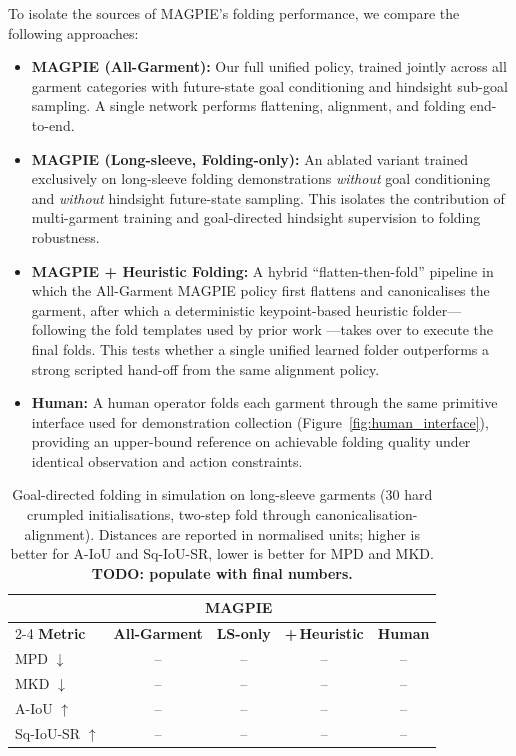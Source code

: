\documentclass[journal]{IEEEtran}
\begin{document}
To isolate the sources of MAGPIE's folding performance, we compare the following approaches:
\begin{itemize}
    \item \textbf{MAGPIE (All-Garment):} Our full unified policy, trained jointly across all garment categories with future-state goal conditioning and hindsight sub-goal sampling. A single network performs flattening, alignment, and folding end-to-end.
    \item \textbf{MAGPIE (Long-sleeve, Folding-only):} An ablated variant trained exclusively on long-sleeve folding demonstrations \emph{without} goal conditioning and \emph{without} hindsight future-state sampling. This isolates the contribution of multi-garment training and goal-directed hindsight supervision to folding robustness.
    \item \textbf{MAGPIE + Heuristic Folding:} A hybrid ``flatten-then-fold'' pipeline in which the All-Garment MAGPIE policy first flattens and canonicalises the garment, after which a deterministic keypoint-based heuristic folder---following the fold templates used by prior work \cite{canberk2022cloth, xue2023unifolding}---takes over to execute the final folds. This tests whether a single unified learned folder outperforms a strong scripted hand-off from the same alignment policy.
    \item \textbf{Human:} A human operator folds each garment through the same primitive interface used for demonstration collection (Figure~\ref{fig:human_interface}), providing an upper-bound reference on achievable folding quality under identical observation and action constraints.
\end{itemize}

\begin{table}[!t]
\caption{Goal-directed folding in simulation on long-sleeve garments (30 hard crumpled initialisations, two-step fold through canonicalisation-alignment). Distances are reported in normalised units; higher is better for A-IoU and Sq-IoU-SR, lower is better for MPD and MKD. \textbf{TODO: populate with final numbers.}}
\label{tab:sim-folding}
\centering
\small
\begin{tabular}{l|ccc||c}
\toprule
 & \multicolumn{3}{c||}{\textbf{MAGPIE}} & \\
\cmidrule(lr){2-4}
\textbf{Metric} & \textbf{All-Garment} & \textbf{LS-only} & \textbf{+\,Heuristic} & \textbf{Human} \\
\midrule
MPD $\downarrow$        & -- & -- & -- & -- \\
MKD $\downarrow$        & -- & -- & -- & -- \\
A-IoU $\uparrow$        & -- & -- & -- & -- \\
Sq-IoU-SR $\uparrow$    & -- & -- & -- & -- \\
\bottomrule
\end{tabular}
\end{table}
\end{document}
